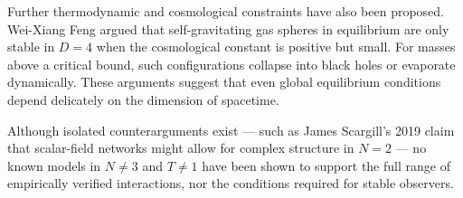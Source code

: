 \begin{historical}
Further thermodynamic and cosmological constraints have also been proposed. Wei-Xiang Feng argued that self-gravitating gas spheres in equilibrium are only stable in $D = 4$ when the cosmological constant is positive but small. For masses above a critical bound, such configurations collapse into black holes or evaporate dynamically. These arguments suggest that even global equilibrium conditions depend delicately on the dimension of spacetime.

Although isolated counterarguments exist — such as James Scargill’s 2019 claim that scalar-field networks might allow for complex structure in $N = 2$ — no known models in $N \ne 3$ and $T \ne 1$ have been shown to support the full range of empirically verified interactions, nor the conditions required for stable observers.
\end{historical}
